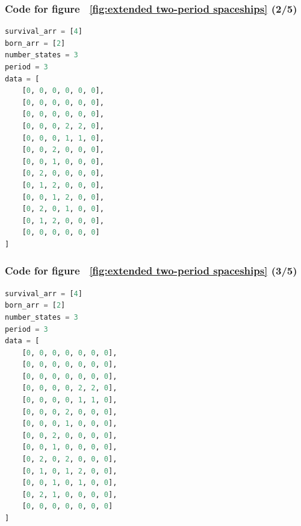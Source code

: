 \documentclass[12pt]{article}
\numberwithin{figure}{section} %
\begin{document}
\noindent\begin{minipage}{.45\textwidth}
\subsubsection{Code for figure ~\ref{fig:extended two-period spaceships} (2/5)}
\label{subsubsection:extended two-period spaceships(2/5)}
\begin{lstlisting}[language = Python]
survival_arr = [4]
born_arr = [2]
number_states = 3
period = 3
data = [
    [0, 0, 0, 0, 0, 0],
    [0, 0, 0, 0, 0, 0],
    [0, 0, 0, 0, 0, 0],
    [0, 0, 0, 2, 2, 0],
    [0, 0, 0, 1, 1, 0],
    [0, 0, 2, 0, 0, 0],
    [0, 0, 1, 0, 0, 0],
    [0, 2, 0, 0, 0, 0],
    [0, 1, 2, 0, 0, 0],
    [0, 0, 1, 2, 0, 0],
    [0, 2, 0, 1, 0, 0],
    [0, 1, 2, 0, 0, 0],
    [0, 0, 0, 0, 0, 0]
]
\end{lstlisting}
\end{minipage}\hfill
\begin{minipage}{.45\textwidth}
\subsubsection{Code for figure ~\ref{fig:extended two-period spaceships} (3/5)}
\label{subsubsection:extended two-period spaceships(3/5)}
\begin{lstlisting}[language = Python]
survival_arr = [4]
born_arr = [2]
number_states = 3
period = 3
data = [
    [0, 0, 0, 0, 0, 0, 0],
    [0, 0, 0, 0, 0, 0, 0],
    [0, 0, 0, 0, 0, 0, 0],
    [0, 0, 0, 0, 2, 2, 0],
    [0, 0, 0, 0, 1, 1, 0],
    [0, 0, 0, 2, 0, 0, 0],
    [0, 0, 0, 1, 0, 0, 0],
    [0, 0, 2, 0, 0, 0, 0],
    [0, 0, 1, 0, 0, 0, 0],
    [0, 2, 0, 2, 0, 0, 0],
    [0, 1, 0, 1, 2, 0, 0],
    [0, 0, 1, 0, 1, 0, 0],
    [0, 2, 1, 0, 0, 0, 0],
    [0, 0, 0, 0, 0, 0, 0]
]
\end{lstlisting}
\end{minipage}
\end{document}
